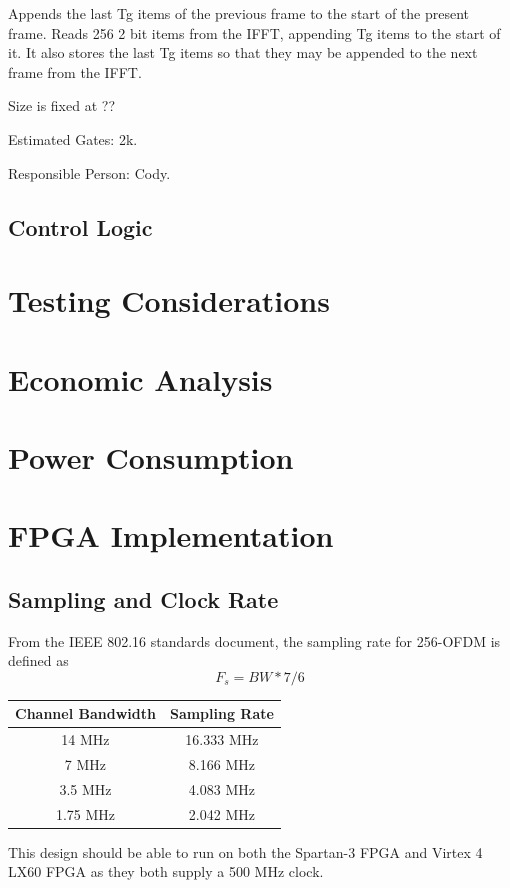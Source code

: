 \documentclass[dvips,10pt,twocolumn]{article}
\begin{document}
	Appends the last Tg items of the previous frame to the start of the
	present frame.  Reads 256 2 bit items from the IFFT, appending Tg
	items to the start of it. It also stores the last Tg items so that
	they may be appended to the next frame from the IFFT.

	Size is fixed at ??

	Estimated Gates: 2k.

	Responsible Person: Cody.

	\subsection{Control Logic}
	\label{sec:ctrl}

\section{Testing Considerations}
\section{Economic Analysis}
\section{Power Consumption}
\section{FPGA Implementation}
  \subsection{Sampling and Clock Rate}
    From the IEEE 802.16 standards document, the sampling rate for
    256-OFDM is defined as
    \begin{equation}
    F_s = BW * 7/6
    \end{equation}
  
  \begin{center}
  \begin{tabular}{c|c}
  Channel Bandwidth & Sampling Rate \\ \hline
  14 MHz & 16.333 MHz \\
  7 MHz & 8.166 MHz \\
  3.5 MHz & 4.083 MHz \\
  1.75 MHz & 2.042 MHz
  \end{tabular}
  \end{center}
  
  This design should be able to run on both the Spartan-3 FPGA and Virtex 4 LX60
  FPGA as they both supply a 500 MHz clock.
  
\end{document}
